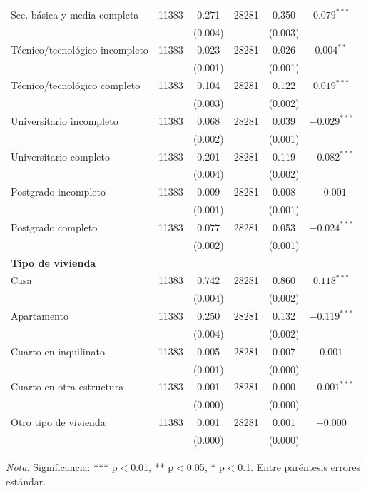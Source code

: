 \documentclass{article}
\begin{document}
\begin{table}[H]
\begin{tabular}{l c c c c c}
    Sec. básica y media completa & 11383 & 0.271 & 28281 & 0.350 & $0.079^{***}$ \\
     & & (0.004) & & (0.003) & \\
    Técnico/tecnológico incompleto & 11383 & 0.023 & 28281 & 0.026 & $0.004^{**}$ \\
     & & (0.001) & & (0.001) & \\
    Técnico/tecnológico completo & 11383 & 0.104 & 28281 & 0.122 & $0.019^{***}$ \\
     & & (0.003) & & (0.002) & \\
    Universitario incompleto & 11383 & 0.068 & 28281 & 0.039 & $-0.029^{***}$ \\
     & & (0.002) & & (0.001) & \\
    Universitario completo & 11383 & 0.201 & 28281 & 0.119 & $-0.082^{***}$ \\
     & & (0.004) & & (0.002) & \\
    Postgrado incompleto & 11383 & 0.009 & 28281 & 0.008 & $-0.001$ \\
     & & (0.001) & & (0.001) & \\
    Postgrado completo & 11383 & 0.077 & 28281 & 0.053 & $-0.024^{***}$ \\
     & & (0.002) & & (0.001) & \\
    \midrule
    \textbf{Tipo de vivienda} & & & & & \\
    Casa & 11383 & 0.742 & 28281 & 0.860 & $0.118^{***}$ \\
     & & (0.004) & & (0.002) & \\
    Apartamento & 11383 & 0.250 & 28281 & 0.132 & $-0.119^{***}$ \\
     & & (0.004) & & (0.002) & \\
    Cuarto en inquilinato & 11383 & 0.005 & 28281 & 0.007 & $0.001$ \\
     & & (0.001) & & (0.000) & \\
    Cuarto en otra estructura & 11383 & 0.001 & 28281 & 0.000 & $-0.001^{***}$ \\
     & & (0.000) & & (0.000) & \\
    Otro tipo de vivienda & 11383 & 0.001 & 28281 & 0.001 & $-0.000$ \\
     & & (0.000) & & (0.000) & \\
    \bottomrule
  \end{tabular}
  \parbox[t]{\textwidth}{%
    \vspace{0.5em}
    \footnotesize{\textit{Nota:} Significancia: *** p$<$0.01, ** p$<$0.05, * p$<$0.1. Entre paréntesis errores estándar.}}
\end{table}
\end{document}
